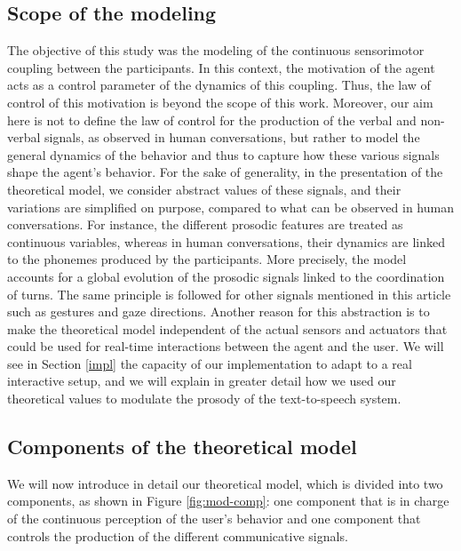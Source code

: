 \documentclass[twocolumn]{svjour3}
\begin{document}
\subsection{Scope of the modeling}

The objective of this study was the modeling of the continuous sensorimotor coupling between the participants. In this context, the motivation of the agent acts as a control parameter of the dynamics of this coupling. Thus, the law of control of this motivation is beyond  the scope of this work.
Moreover, our aim here is not to define the law of control for the production of the verbal and non-verbal signals, as observed in human conversations, but rather to model the general dynamics of the behavior and thus to capture how these various signals shape the agent's behavior. For the sake of generality, in the presentation of the theoretical model, we consider abstract values of these signals, and their variations are simplified on purpose, compared to what can be observed in human conversations.
For instance, the different prosodic features are treated as continuous variables, whereas in human conversations, their dynamics are linked to the phonemes produced by the participants. More precisely, the model accounts for a global evolution of the prosodic signals linked to the coordination of turns.
The same principle is followed for other signals mentioned in this article such as gestures and gaze directions. 
Another reason for this abstraction is to make the  theoretical model independent of the actual sensors and actuators that could be used for real-time interactions between the agent and the user. 
We will see in Section \ref{impl} the capacity of our implementation to adapt to a real interactive setup, and we will explain in greater detail how we used our theoretical values to modulate the prosody of the text-to-speech system.

\subsection{Components of the theoretical model}

We will now introduce in detail our theoretical model, which is divided into two components, as shown in Figure \ref{fig:mod-comp}: one component that is in charge of the continuous perception of the user's behavior and one component that controls the production of the different communicative signals. 
\end{document}
